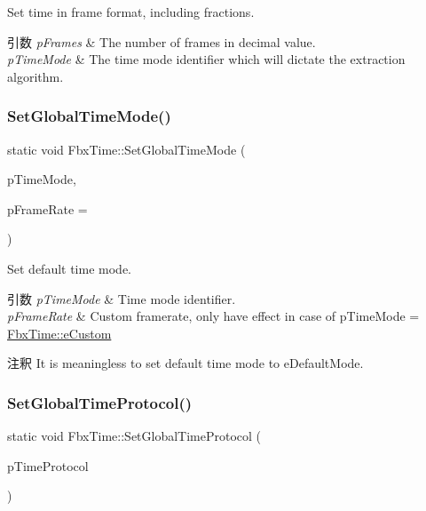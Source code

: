 Set time in frame format, including fractions. 
\begin{DoxyParams}{引数}
{\em p\+Frames} & The number of frames in decimal value. \\
\hline
{\em p\+Time\+Mode} & The time mode identifier which will dictate the extraction algorithm. \\
\hline
\end{DoxyParams}
\mbox{\label{class_fbx_time_a0bd3eab238596b63a1bc8e8ac830844b}} 
\subsubsection{\texorpdfstring{Set\+Global\+Time\+Mode()}{SetGlobalTimeMode()}}
{\footnotesize\ttfamily static void Fbx\+Time\+::\+Set\+Global\+Time\+Mode (\begin{DoxyParamCaption}\item[{\hyperlink{class_fbx_time_acc529b00a0e8d4c3da3702449ca93031}{E\+Mode}}]{p\+Time\+Mode,  }\item[{double}]{p\+Frame\+Rate = {} }\end{DoxyParamCaption})\hspace{0.3cm}{\ttfamily [static]}}

Set default time mode. 
\begin{DoxyParams}{引数}
{\em p\+Time\+Mode} & Time mode identifier. \\
\hline
{\em p\+Frame\+Rate} & Custom framerate, only have effect in case of p\+Time\+Mode = \hyperlink{class_fbx_time_acc529b00a0e8d4c3da3702449ca93031afb5f0e69ae6545d1d0efa35400a69a13}{Fbx\+Time\+::e\+Custom} \\
\hline
\end{DoxyParams}
\begin{DoxyRemark}{注釈}
It is meaningless to set default time mode to {\ttfamily e\+Default\+Mode}. 
\end{DoxyRemark}
\mbox{\label{class_fbx_time_ab455ab67a792cbf5d691db58d988a905}} 
\subsubsection{\texorpdfstring{Set\+Global\+Time\+Protocol()}{SetGlobalTimeProtocol()}}
{\footnotesize\ttfamily static void Fbx\+Time\+::\+Set\+Global\+Time\+Protocol (\begin{DoxyParamCaption}\item[{\hyperlink{class_fbx_time_a10ffa1fdce0aa7f63ec24bdd23afff4b}{E\+Protocol}}]{p\+Time\+Protocol }\end{DoxyParamCaption})\hspace{0.3cm}{\ttfamily [static]}}

